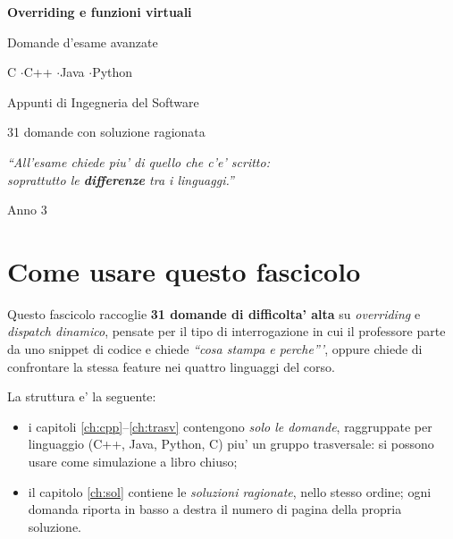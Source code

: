 \documentclass{report}
\begin{document}
\begin{titlepage}
    \centering
    \vspace*{2.5cm}
    {\Huge\sffamily\bfseries Overriding e funzioni virtuali\par}
    \vspace{0.5cm}
    {\LARGE\sffamily Domande d'esame avanzate\par}
    \vspace{1.0cm}
    {\LARGE\sffamily C \quad$\cdot$\quad C++ \quad$\cdot$\quad Java \quad$\cdot$\quad Python\par}
    \vspace{1.4cm}
    {\Large Appunti di Ingegneria del Software\par}
    \vspace{0.4cm}
    {\large 31 domande con soluzione ragionata\par}
    \vspace{2cm}
    {\large\itshape ``All'esame chiede piu' di quello che c'e' scritto:\\
    soprattutto le \textbf{differenze} tra i linguaggi.''\par}
    \vfill
    {\large Anno 3\par}
\end{titlepage}

\tableofcontents
\newpage

\chapter{Come usare questo fascicolo}

Questo fascicolo raccoglie \textbf{31 domande di difficolta' alta} su
\emph{overriding} e \emph{dispatch dinamico}, pensate per il tipo di
interrogazione in cui il professore parte da uno snippet di codice e chiede
\emph{``cosa stampa e perche'''}, oppure chiede di confrontare la stessa
feature nei quattro linguaggi del corso.

La struttura e' la seguente:

\begin{itemize}
    \item i capitoli \ref{ch:cpp}--\ref{ch:trasv} contengono \emph{solo le
          domande}, raggruppate per linguaggio (C++, Java, Python, C) piu' un
          gruppo trasversale: si possono usare come simulazione a libro chiuso;
    \item il capitolo \ref{ch:sol} contiene le \emph{soluzioni ragionate},
          nello stesso ordine; ogni domanda riporta in basso a destra il numero
          di pagina della propria soluzione.
\end{itemize}
\end{document}
